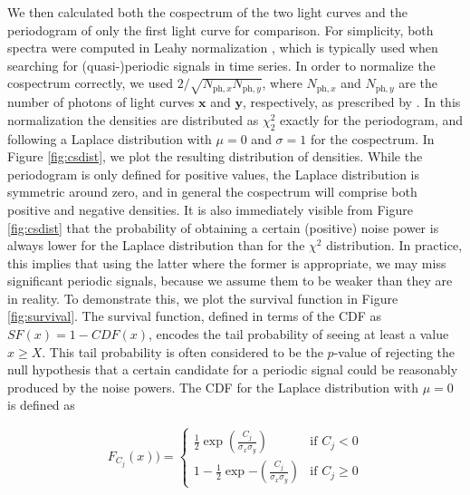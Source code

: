 \documentclass[12pt]{emulateapj}
\begin{document}
We then calculated both the cospectrum of the two light curves and the periodogram of only the first light curve for comparison. For simplicity, both spectra were computed in Leahy normalization \citep{leahy1983}, which is typically used when searching for (quasi-)periodic signals in time series.
In order to normalize the cospectrum correctly, we used $2/\sqrt{N_{\mathrm{ph}, x}N_{\mathrm{ph}, y}}$, where $N_{\mathrm{ph}, x}$ and $N_{\mathrm{ph}, y}$ are the number of photons of light curves $\mathbf{x}$ and $\mathbf{y}$, respectively, as prescribed by \citet{Bachetti+15}.
In this normalization the densities are distributed as $\chi^2_2$ exactly for the periodogram, and following a Laplace distribution with $\mu=0$ and $\sigma = 1$ for the cospectrum. In Figure \ref{fig:csdist}, we plot the resulting distribution of densities. While the periodogram is only defined for positive values, the Laplace distribution is symmetric around zero, and in general the cospectrum will comprise both positive and negative densities. It is also immediately visible from Figure \ref{fig:csdist} that the probability of obtaining a certain (positive) noise power is always lower for the Laplace distribution than for the $\chi^2$ distribution. In practice, this implies that using the latter where the former is appropriate, we may miss significant periodic signals, because we assume them to be weaker than they are in reality. To demonstrate this, we plot the survival function in Figure \ref{fig:survival}. The survival function, defined in terms of the CDF as $SF(x) = 1 - CDF(x)$, encodes the tail probability of seeing at least a value $x \geq X$. This tail probability is often considered to be the $p$-value of rejecting the null hypothesis that a certain candidate for a periodic signal could be reasonably produced by the noise powers. The CDF for the Laplace distribution with $\mu=0$ is defined as 

\begin{equation}
\label{eqn:cospectrum_cdf}
F_{C_j}(x)) = 
  \begin{cases} 
   \frac{1}{2} \exp{\left(\frac{C_j}{\sigma_x \sigma_y}\right)}  & \text{if } C_j < 0 \\
    1 - \frac{1}{2} \exp{-\left( \frac{C_j}{\sigma_x \sigma_y} \right)}   & \text{if } C_j \geq 0
  \end{cases}
\end{equation}
\end{document}
